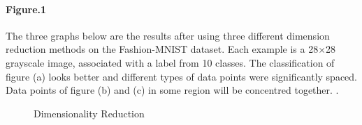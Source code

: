 \documentclass[12pt]{article}
\begin{document}
\paragraph*{Figure.1} The three graphs below are the results after using three different dimension reduction methods on the Fashion-MNIST dataset\cite{fahionMNIST}.  Each example is a 28$\times$28 grayscale image, associated with a label from 10 classes. The classification of figure (a) looks better and different types of data points were significantly spaced. Data points of figure (b) and (c) in some region will be concentred together. .%
\begin{figure} [H]
	\centering
	\caption{Dimensionality Reduction}
	\label{Fig.1}
\end{figure}
\end{document}
